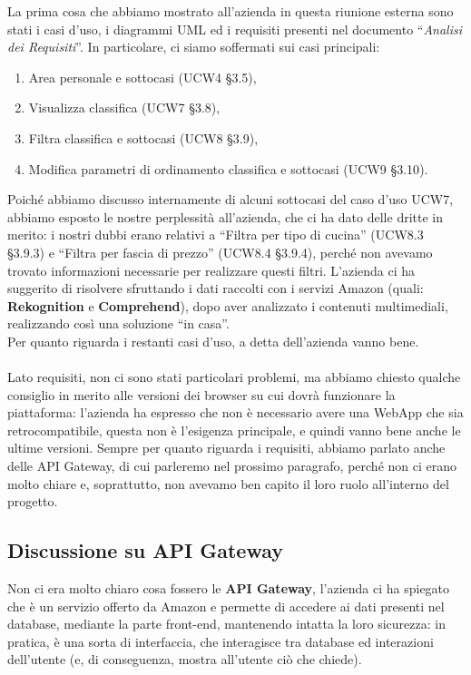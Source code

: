 La prima cosa che abbiamo mostrato all'azienda in questa riunione esterna sono stati i casi d'uso, i diagrammi UML ed i requisiti presenti nel documento “\textit{Analisi dei Requisiti}”. In particolare, ci siamo soffermati sui casi principali:

\begin{enumerate}
\item Area personale e sottocasi (UCW4 \S{}3.5),
\item Visualizza classifica (UCW7 \S{}3.8),
\item Filtra classifica e sottocasi (UCW8 \S{}3.9),
\item Modifica parametri di ordinamento classifica e sottocasi (UCW9 \S{3.10}).
\end{enumerate}

Poiché abbiamo discusso internamente di alcuni sottocasi del caso d'uso UCW7, abbiamo esposto le nostre perplessità all'azienda, che ci ha dato delle dritte in merito: i nostri dubbi erano relativi a “Filtra per tipo di cucina” (UCW8.3 \S{}3.9.3) e “Filtra per fascia di prezzo” (UCW8.4 \S{}3.9.4), perché non avevamo trovato informazioni necessarie per realizzare questi filtri. L'azienda ci ha suggerito di risolvere sfruttando i dati raccolti con i servizi Amazon (quali: \textbf{Rekognition} e \textbf{Comprehend}), dopo aver analizzato i contenuti multimediali, realizzando così una soluzione “in casa”.
\\
Per quanto riguarda i restanti casi d'uso, a detta dell'azienda vanno bene.
\\ \\
Lato requisiti, non ci sono stati particolari problemi, ma abbiamo chiesto qualche consiglio in merito alle versioni dei browser su cui dovrà funzionare la piattaforma: l'azienda ha espresso che non è necessario avere una WebApp che sia retrocompatibile, questa non è l'esigenza principale, e quindi vanno bene anche le ultime versioni. Sempre per quanto riguarda i requisiti, abbiamo parlato anche delle API Gateway, di cui parleremo nel prossimo paragrafo, perché non ci erano molto chiare e, soprattutto, non avevamo ben capito il loro ruolo all'interno del progetto.

\subsection{Discussione su API Gateway}

Non ci era molto chiaro cosa fossero le \textbf{API Gateway}, l'azienda ci ha spiegato che è un servizio offerto da Amazon e permette di accedere ai dati presenti nel database, mediante la parte front-end, mantenendo intatta la loro sicurezza: in pratica, è una sorta di interfaccia, che interagisce tra database ed interazioni dell'utente (e, di conseguenza, mostra all'utente ciò che chiede).

